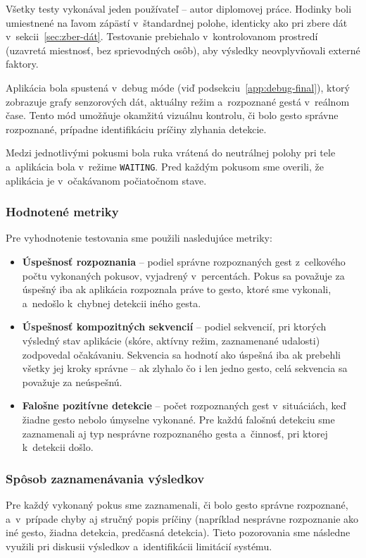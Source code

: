 Všetky testy vykonával jeden používateľ -- autor
diplomovej práce. Hodinky boli umiestnené na ľavom
zápästí v~štandardnej polohe, identicky ako pri
zbere dát v~sekcii~\ref{sec:zber-dát}. Testovanie
prebiehalo v~kontrolovanom prostredí (uzavretá
miestnosť, bez sprievodných osôb), aby výsledky
neovplyvňovali externé faktory.

Aplikácia bola spustená v~debug móde
(viď podsekciu~\ref{app:debug-final}), ktorý
zobrazuje grafy senzorových dát, aktuálny režim
a~rozpoznané gestá v~reálnom čase. Tento mód
umožňuje okamžitú vizuálnu kontrolu, či bolo gesto
správne rozpoznané, prípadne identifikáciu príčiny
zlyhania detekcie.

Medzi jednotlivými pokusmi bola ruka vrátená do
neutrálnej polohy pri tele a~aplikácia bola
v~režime \texttt{WAITING}. Pred každým pokusom
sme overili, že aplikácia je v~očakávanom
počiatočnom stave.

\subsubsection{Hodnotené metriky}

Pre vyhodnotenie testovania sme použili nasledujúce
metriky:

\begin{itemize}
  \item \textbf{Úspešnosť rozpoznania} -- podiel správne
        rozpoznaných gest z~celkového počtu vykonaných
        pokusov, vyjadrený v~percentách. Pokus sa
        považuje za úspešný iba ak aplikácia rozpoznala
        práve to gesto, ktoré sme vykonali, a~nedošlo
        k~chybnej detekcii iného gesta.

  \item \textbf{Úspešnosť kompozitných sekvencií} --
        podiel sekvencií, pri ktorých výsledný stav
        aplikácie (skóre, aktívny režim, zaznamenané
        udalosti) zodpovedal očakávaniu. Sekvencia
        sa hodnotí ako úspešná iba ak prebehli všetky
        jej kroky správne -- ak zlyhalo čo i len jedno
        gesto, celá sekvencia sa považuje za neúspešnú.

  \item \textbf{Falošne pozitívne detekcie} -- počet
        rozpoznaných gest v~situáciách, keď žiadne
        gesto nebolo úmyselne vykonané. Pre každú
        falošnú detekciu sme zaznamenali aj typ
        nesprávne rozpoznaného gesta a~činnosť, pri
        ktorej k~detekcii došlo.
\end{itemize}

\subsubsection{Spôsob zaznamenávania výsledkov}

Pre každý vykonaný pokus sme zaznamenali, či bolo
gesto správne rozpoznané, a~v~prípade chyby aj
stručný popis príčiny (napríklad nesprávne rozpoznanie
ako iné gesto, žiadna detekcia, predčasná detekcia).
Tieto pozorovania sme následne využili pri diskusii
výsledkov a~identifikácii limitácií systému.